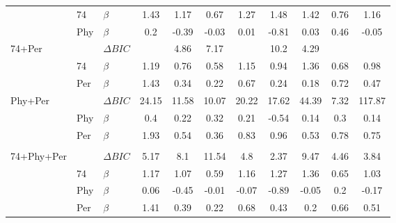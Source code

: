 \begin{table}[!h]
\begin{tabular}[t]{lllcccccccc}
 & 74 & $\beta$ & 1.43 & 1.17 & 0.67 & 1.27 & 1.48 & 1.42 & 0.76 & 1.16\\
 & Phy & $\beta$ & 0.2 & -0.39 & -0.03 & 0.01 & -0.81 & 0.03 & 0.46 & -0.05\\
74+Per &  & $\Delta BIC$ & \cellcolor[HTML]{ffe0f1}{\textbf{0}} & 4.86 & 7.17 & \cellcolor[HTML]{fff9d7}{\textbf{0}} & 10.2 & 4.29 & \cellcolor[HTML]{f7e6ff}{\textbf{0}} & \cellcolor[HTML]{e8e0ef}{\textbf{0}}\\
 & 74 & $\beta$ & 1.19 & 0.76 & 0.58 & 1.15 & 0.94 & 1.36 & 0.68 & 0.98\\
 & Per & $\beta$ & 1.43 & 0.34 & 0.22 & 0.67 & 0.24 & 0.18 & 0.72 & 0.47\\
Phy+Per &  & $\Delta BIC$ & 24.15 & 11.58 & 10.07 & 20.22 & 17.62 & 44.39 & 7.32 & 117.87\\
 & Phy & $\beta$ & 0.4 & 0.22 & 0.32 & 0.21 & -0.54 & 0.14 & 0.3 & 0.14\\
 & Per & $\beta$ & 1.93 & 0.54 & 0.36 & 0.83 & 0.96 & 0.53 & 0.78 & 0.75\\
\addlinespace[0.0em]
\hline
\multicolumn{11}{c}{Full Model}\\
\hline
74+Phy+Per &  & $\Delta BIC$ & 5.17 & 8.1 & 11.54 & 4.8 & 2.37 & 9.47 & 4.46 & 3.84\\
 & 74 & $\beta$ & 1.17 & 1.07 & 0.59 & 1.16 & 1.27 & 1.36 & 0.65 & 1.03\\
 & Phy & $\beta$ & 0.06 & -0.45 & -0.01 & -0.07 & -0.89 & -0.05 & 0.2 & -0.17\\
 & Per & $\beta$ & 1.41 & 0.39 & 0.22 & 0.68 & 0.43 & 0.2 & 0.66 & 0.51\\
\bottomrule
\end{tabular}
\end{table}
